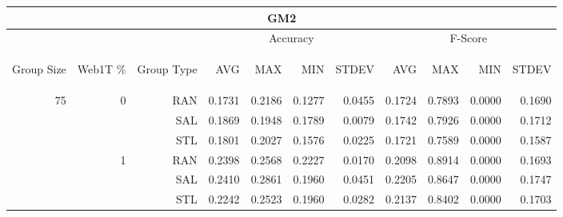 \begin{center}
\begin{table}[htbp]
\begin{tabular}{ | r | r | r | r | r | r | r | r | r | r | r |}
\hline
\multicolumn{11}{|c|}{GM2}\\
\hline
 & & & \multicolumn{4}{|c|}{Accuracy} & \multicolumn{4}{|c|}{F-Score}\\ \cline{4-11}
\begin{sideways}Group Size\end{sideways} & \begin{sideways}Web1T \%\end{sideways} & \begin{sideways}Group Type\end{sideways} & \begin{sideways}AVG\end{sideways} & \begin{sideways}MAX\end{sideways} & \begin{sideways}MIN\end{sideways} & \begin{sideways}STDEV\end{sideways} & \begin{sideways}AVG\end{sideways} & \begin{sideways}MAX\end{sideways} & \begin{sideways}MIN\end{sideways} & \begin{sideways}STDEV\end{sideways}\\
\hline
\multirow{15}{*}{75}
 & \multirow{3}{*}{0} & RAN & 0.1731 & 0.2186 & 0.1277 & 0.0455 & 0.1724 & 0.7893 & 0.0000 & 0.1690\\ \cline{3-11}
 &   & SAL & 0.1869 & 0.1948 & 0.1789 & 0.0079 & 0.1742 & 0.7926 & 0.0000 & 0.1712\\ \cline{3-11}
 &   & STL & 0.1801 & 0.2027 & 0.1576 & 0.0225 & 0.1721 & 0.7589 & 0.0000 & 0.1587\\ \cline{2-11}
 & \multirow{3}{*}{1} & RAN & 0.2398 & 0.2568 & 0.2227 & 0.0170 & 0.2098 & 0.8914 & 0.0000 & 0.1693\\ \cline{3-11}
 &   & SAL & 0.2410 & 0.2861 & 0.1960 & 0.0451 & 0.2205 & 0.8647 & 0.0000 & 0.1747\\ \cline{3-11}
 &   & STL & 0.2242 & 0.2523 & 0.1960 & 0.0282 & 0.2137 & 0.8402 & 0.0000 & 0.1703\\ \cline{2-11}

\end{tabular}
\end{table}
\end{center}
